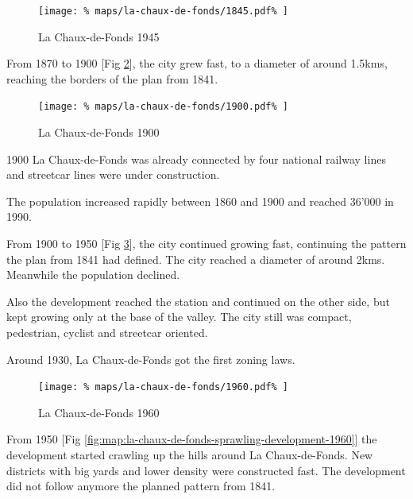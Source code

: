 \documentclass{article}
\begin{document}
\begin{multicols}{2}
			\begin{figure}[H]
				\texttt{[image: \%
					maps/la-chaux-de-fonds/1845.pdf\%
				]}
				\caption{La Chaux-de-Fonds 1945  \cite{MapGeoAdmin:LaChauxDeFonds}}
				\label{fig:map:la-chaux-de-fonds-1945}
			\end{figure}	
			
			From 1870 to 1900 [Fig \ref{fig:map:la-chaux-de-fonds-1900}], the city grew fast, to a diameter of around 1.5kms, reaching the borders of the plan from 1841.
			
			\begin{figure}[H]
				\texttt{[image: \%
					maps/la-chaux-de-fonds/1900.pdf\%
				]}
				\caption{La Chaux-de-Fonds 1900  \cite{MapGeoAdmin:LaChauxDeFonds}}
				\label{fig:map:la-chaux-de-fonds-1900}
			\end{figure}
			
			1900 La Chaux-de-Fonds was already connected by four national railway lines and streetcar lines were under construction.
			
			
			The population increased rapidly between 1860 and 1900 and reached 36'000 in 1990.

			

			From 1900 to 1950 [Fig \ref{fig:map:la-chaux-de-fonds-1960}], the city continued growing fast, continuing the pattern the plan from 1841 had defined. The city reached a diameter of around 2kms. Meanwhile the population declined.
			
			Also the development reached the station and continued on the other side, but kept growing only at the base of the valley.
			The city still was compact, pedestrian, cyclist and streetcar oriented.
			
			Around 1930, La Chaux-de-Fonds got the first zoning laws.
			
			\begin{figure}[H]
				\texttt{[image: \%
					maps/la-chaux-de-fonds/1960.pdf\%
				]}
				\caption{La Chaux-de-Fonds 1960  \cite{MapGeoAdmin:LaChauxDeFonds}}
				\label{fig:map:la-chaux-de-fonds-1960}
			\end{figure}
			
			
			From 1950 [Fig \ref{fig:map:la-chaux-de-fonds-sprawling-development-1960}] the development started crawling up the hills around La Chaux-de-Fonds.
			New districts with big yards and lower density were constructed fast.
			The development did not follow anymore the planned pattern from 1841.
			

\end{multicols}
\end{document}
